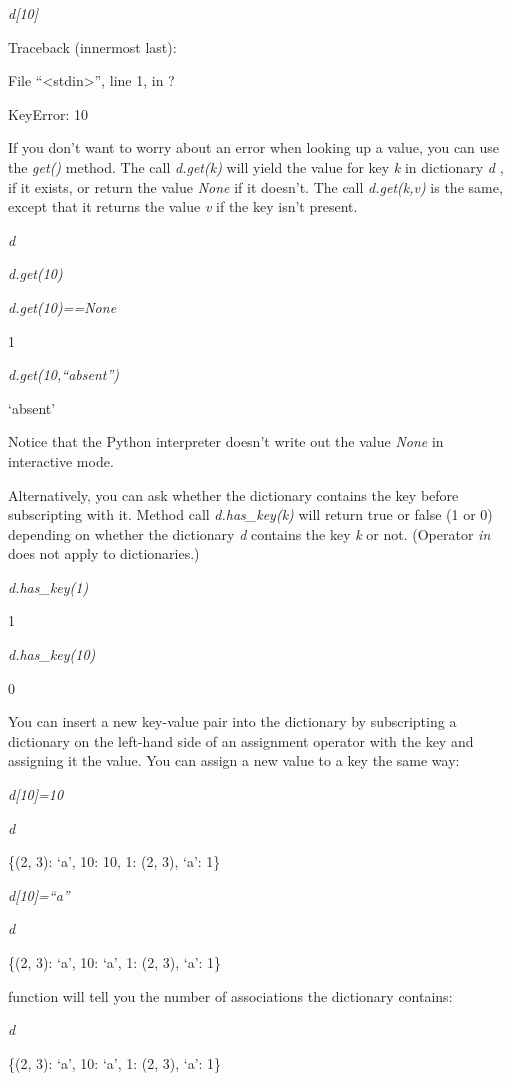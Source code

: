 \emph{d{[}10{]}}

Traceback (innermost last):

 File
``\textless{}stdin\textgreater{}'', line 1, in ?

KeyError: 10

If you don't want to worry about an
error when looking up a value, you can use the \emph{get()} method. The
call \emph{d.get(k)} will yield the value for key \emph{k} in dictionary
\emph{d} , if it exists, or return the value \emph{None} if it doesn't.
The call \emph{d.get(k,v)} is the same, except that it returns the value
\emph{v} if the key isn't present.


\emph{d}




\emph{d.get(10)}


\emph{d.get(10)==None}

1


\emph{d.get(10,``absent'')}

`absent'

Notice that the Python interpreter
doesn't write out the value \emph{None} in interactive mode.

Alternatively, you can ask whether
the dictionary contains the key before subscripting with it. Method call
\emph{d.has\_key(k)} will return true or false (1 or 0) depending on
whether the dictionary \emph{d} contains the key \emph{k} or not.
(Operator \emph{in} does not apply to dictionaries.)


\emph{d.has\_key(1)}

1


\emph{d.has\_key(10)}

0

You can insert a new key-value pair
into the dictionary by subscripting a dictionary on the left-hand side
of an assignment operator with the key and assigning it the value. You
can assign a new value to a key the same way:


\emph{d{[}10{]}=10}


\emph{d}

\{(2, 3): `a', 10: 10, 1: (2, 3),
`a': 1\}


\emph{d{[}10{]}=``a''}


\emph{d}

\{(2, 3): `a', 10: `a', 1: (2, 3),
`a': 1\}

 function will tell
you the number of associations the dictionary contains:


\emph{d}

\{(2, 3): `a', 10: `a', 1: (2, 3),
`a': 1\}


